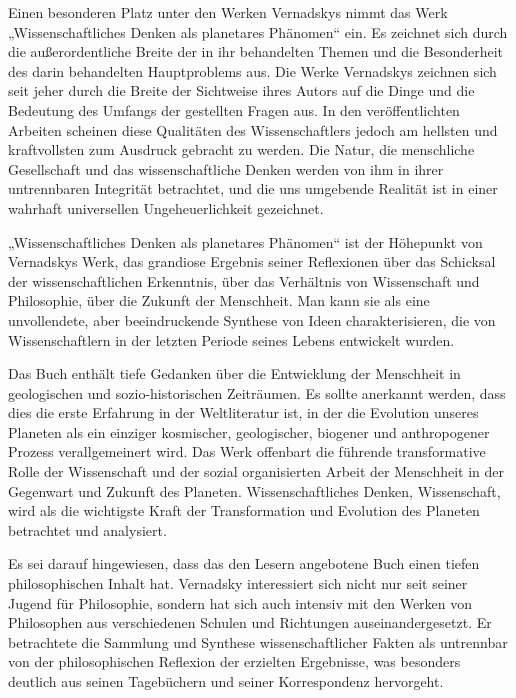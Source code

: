 \documentclass[11pt,a4paper]{article}
\begin{document}
Einen besonderen Platz unter den Werken Vernadskys nimmt das Werk
„Wissenschaftliches Denken als planetares Phänomen“ ein. Es zeichnet sich
durch die außerordentliche Breite der in ihr behandelten Themen und die
Besonderheit des darin behandelten Hauptproblems aus. Die Werke Vernadskys
zeichnen sich seit jeher durch die Breite der Sichtweise ihres Autors auf die
Dinge und die Bedeutung des Umfangs der gestellten Fragen aus. In den
veröffentlichten Arbeiten scheinen diese Qualitäten des Wissenschaftlers
jedoch am hellsten und kraftvollsten zum Ausdruck gebracht zu werden. Die
Natur, die menschliche Gesellschaft und das wissenschaftliche Denken werden
von ihm in ihrer untrennbaren Integrität betrachtet, und die uns umgebende
Realität ist in einer wahrhaft universellen Ungeheuerlichkeit gezeichnet.

„Wissenschaftliches Denken als planetares Phänomen“ ist der Höhepunkt von
Vernadskys Werk, das grandiose Ergebnis seiner Reflexionen über das Schicksal
der wissenschaftlichen Erkenntnis, über das Verhältnis von Wissenschaft und
Philosophie, über die Zukunft der Menschheit. Man kann sie als eine
unvollendete, aber beeindruckende Synthese von Ideen charakterisieren, die von
Wissenschaftlern in der letzten Periode seines Lebens entwickelt wurden.

Das Buch enthält tiefe Gedanken über die Entwicklung der Menschheit in
geologischen und sozio-historischen Zeiträumen. Es sollte anerkannt werden,
dass dies die erste Erfahrung in der Weltliteratur ist, in der die Evolution
unseres Planeten als ein einziger kosmischer, geologischer, biogener und
anthropogener Prozess verallgemeinert wird. Das Werk offenbart die führende
transformative Rolle der Wissenschaft und der sozial organisierten Arbeit der
Menschheit in der Gegenwart und Zukunft des Planeten. Wissenschaftliches
Denken, Wissenschaft, wird als die wichtigste Kraft der Transformation und
Evolution des Planeten betrachtet und analysiert.

Es sei darauf hingewiesen, dass das den Lesern angebotene Buch einen tiefen
philosophischen Inhalt hat. Vernadsky interessiert sich nicht nur seit seiner
Jugend für Philosophie, sondern hat sich auch intensiv mit den Werken von
Philosophen aus verschiedenen Schulen und Richtungen auseinandergesetzt. Er
betrachtete die Sammlung und Synthese wissenschaftlicher Fakten als untrennbar
von der philosophischen Reflexion der erzielten Ergebnisse, was besonders
deutlich aus seinen Tagebüchern und seiner Korrespondenz hervorgeht.
\end{document}
